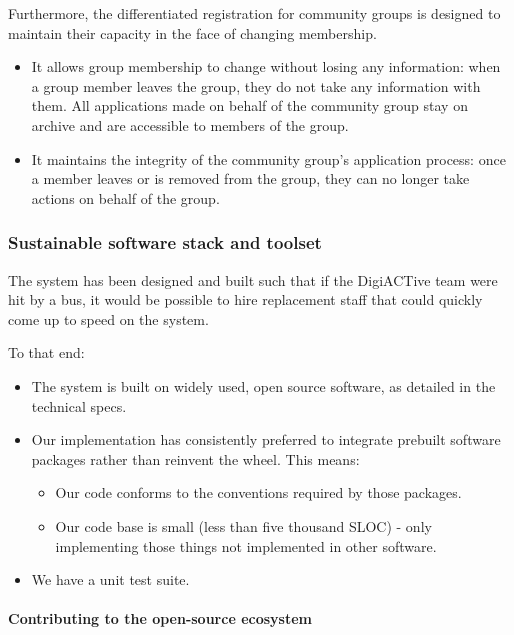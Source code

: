 \documentclass[12pt,a4paper,twosided]{article}
\begin{document}
Furthermore, the differentiated registration for community groups is
designed to maintain their capacity in the face of changing membership.

\begin{itemize}

\item
  It allows group membership to change without losing any information:
  when a group member leaves the group, they do not take any information
  with them. All applications made on behalf of the community group stay
  on archive and are accessible to members of the group.
\item
  It maintains the integrity of the community group's application
  process: once a member leaves or is removed from the group, they can
  no longer take actions on behalf of the group.
\end{itemize}

\subsubsection{Sustainable software stack and toolset}

The system has been designed and built such that if the DigiACTive team
were hit by a bus, it would be possible to hire replacement staff that
could quickly come up to speed on the system.

To that end:

\begin{itemize}

\item
  The system is built on widely used, open source software, as detailed
  in the technical specs.
\item
  Our implementation has consistently preferred to integrate prebuilt
  software packages rather than reinvent the wheel. This means:

  \begin{itemize}
  
  \item
    Our code conforms to the conventions required by those packages.
  \item
    Our code base is small (less than five thousand SLOC) - only
    implementing those things not implemented in other software.
  \end{itemize}
\item
  We have a unit test suite.
\end{itemize}

\paragraph{Contributing to the open-source ecosystem}
\end{document}
